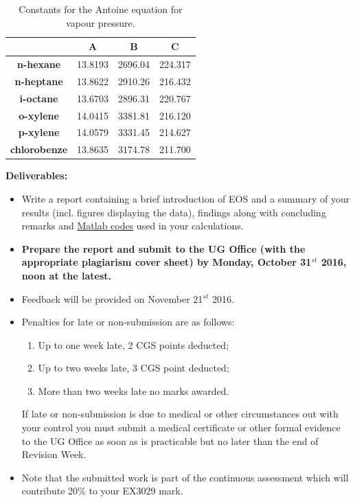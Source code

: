 \documentclass[12pts,a4paper,amsmath,amssymb,floatfix]{article}%
\begin{document}
\begin{enumerate}[label=\bfseries Problem \arabic*:]
\begin{table}[h]
\begin{center}
\begin{tabular}{||c | c c c ||} 
\hline\hline
                           & {\bf A}    &  {\bf B}    & {\bf C}    \\
\hline
{\bf n-hexane}             & 13.8193    & 2696.04     & 224.317    \\  
{\bf n-heptane}            & 13.8622    & 2910.26     & 216.432    \\  
{\bf i-octane}             & 13.6703    & 2896.31     & 220.767    \\  
{\bf o-xylene}             & 14.0415    & 3381.81     & 216.120    \\  
{\bf p-xylene}             & 14.0579    & 3331.45     & 214.627    \\  
{\bf chlorobenze}           & 13.8635    & 3174.78     & 211.700    \\  
\hline\hline
\end{tabular}
\caption{Constants for the Antoine equation for vapour pressure.}
\label{Practical1:Table2}
\end{center}
\end{table}




\end{enumerate}
\clearpage

{\bf Deliverables:}
\begin{itemize}
\item Write a report containing a brief introduction of EOS and a summary of your results (incl. figures displaying the data), findings along with concluding remarks and \underline{Matlab codes} used in your calculations. 
%
\item {\bf Prepare the report and submit to the UG Office (with the appropriate plagiarism cover sheet) by Monday, October 31$^{st}$ 2016, noon at the latest.}
%
\item Feedback will be provided on November 21$^{st}$ 2016.
%
\item Penalties for late or non-submission are as follows:
\begin{enumerate}%
\item Up to one week late, 2 CGS points deducted;
\item Up to two weeks late, 3 CGS point deducted;
\item More than two weeks late no marks awarded.
\end{enumerate}
If late or non-submission is due to medical or other circumstances out with your control you must submit a medical certificate or other formal evidence to the UG Office as soon as is practicable but no later than the end of Revision Week.


\item Note that the submitted work is part of the continuous assessment which will contribute 20$\%$ to your EX3029 mark.

\end{itemize}
\end{document}
